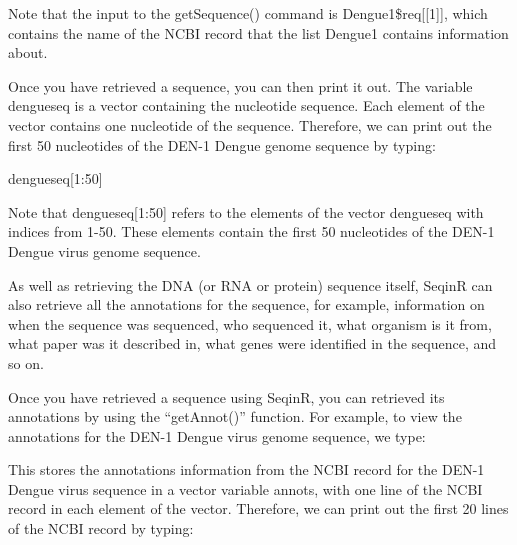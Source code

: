 \documentclass[
]{book}
\newenvironment{Shaded}{\begin{snugshade}}{\end{snugshade}}
\newcommand{\DecValTok}[1]{\textcolor[rgb]{0.00,0.00,0.81}{#1}}
\newcommand{\DocumentationTok}[1]{\textcolor[rgb]{0.56,0.35,0.01}{\textbf{\textit{#1}}}}
\newcommand{\FunctionTok}[1]{\textcolor[rgb]{0.00,0.00,0.00}{#1}}
\newcommand{\NormalTok}[1]{#1}
\newcommand{\OtherTok}[1]{\textcolor[rgb]{0.56,0.35,0.01}{#1}}
\newcommand{\SpecialCharTok}[1]{\textcolor[rgb]{0.00,0.00,0.00}{#1}}
\begin{document}
\begin{Shaded}
\end{Shaded}

Note that the input to the getSequence() command is Dengue1\$req{[}{[}1{]}{]}, which contains the name of the NCBI record that the list Dengue1 contains information about.

Once you have retrieved a sequence, you can then print it out. The variable dengueseq is a vector containing the nucleotide sequence. Each element of the vector contains one nucleotide of the sequence. Therefore, we can print out the first 50 nucleotides of the DEN-1 Dengue genome sequence by typing:

\begin{Shaded}
\begin{Highlighting}[]
\NormalTok{dengueseq[}\DecValTok{1}\SpecialCharTok{:}\DecValTok{50}\NormalTok{]}
\end{Highlighting}
\end{Shaded}

Note that dengueseq{[}1:50{]} refers to the elements of the vector dengueseq with indices from 1-50. These elements contain the first 50 nucleotides of the DEN-1 Dengue virus genome sequence.

As well as retrieving the DNA (or RNA or protein) sequence itself, SeqinR can also retrieve all the annotations for the sequence, for example, information on when the sequence was sequenced, who sequenced it, what organism is it from, what paper was it described in, what genes were identified in the sequence, and so on.

Once you have retrieved a sequence using SeqinR, you can retrieved its annotations by using the ``getAnnot()'' function. For example, to view the annotations for the DEN-1 Dengue virus genome sequence, we type:

\begin{Shaded}
\end{Shaded}

This stores the annotations information from the NCBI record for the DEN-1 Dengue virus sequence in a vector variable annots, with one line of the NCBI record in each element of the vector. Therefore, we can print out the first 20 lines of the NCBI record by typing:
\end{document}
